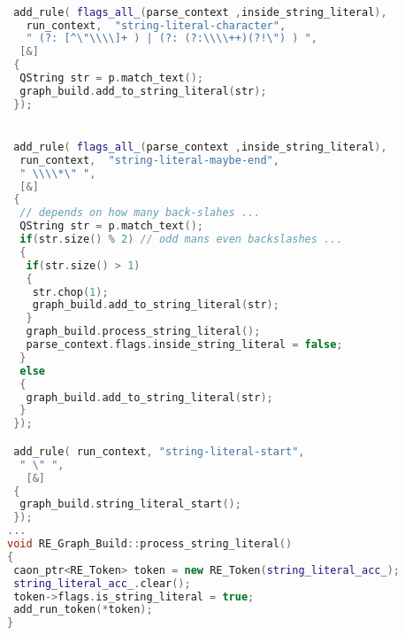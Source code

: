 \begin{lstlisting}[caption={Contextual Parsing for String Literals},
language = C++, numbers = none, label={lst:figStringContext},
    basicstyle = \ttfamily\bfseries\tiny, linewidth = .95\linewidth] 

 add_rule( flags_all_(parse_context ,inside_string_literal), 
   run_context,  "string-literal-character",
   " (?: [^\"\\\\]+ ) | (?: (?:\\\\++)(?!\") ) ",
  [&]
 {
  QString str = p.match_text();
  graph_build.add_to_string_literal(str);
 });


 add_rule( flags_all_(parse_context ,inside_string_literal), 
  run_context,  "string-literal-maybe-end",
  " \\\\*\" ",
  [&]
 {
  // depends on how many back-slahes ...
  QString str = p.match_text();
  if(str.size() % 2) // odd mans even backslashes ...
  {
   if(str.size() > 1)
   {
    str.chop(1);
    graph_build.add_to_string_literal(str);
   }
   graph_build.process_string_literal();
   parse_context.flags.inside_string_literal = false;
  }
  else
  {
   graph_build.add_to_string_literal(str);
  }
 });

 add_rule( run_context, "string-literal-start",
  " \" ",
   [&]
 {
  graph_build.string_literal_start();
 });
...
void RE_Graph_Build::process_string_literal()
{
 caon_ptr<RE_Token> token = new RE_Token(string_literal_acc_);
 string_literal_acc_.clear();
 token->flags.is_string_literal = true;
 add_run_token(*token);
}

\end{lstlisting}
